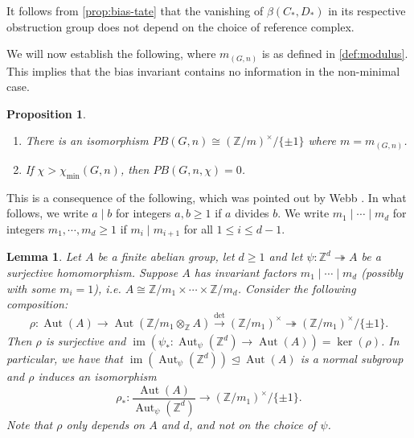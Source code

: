 \documentclass[11pt,a4paper,leqno]{amsart}
\newtheorem{proposition}[theorem]{Proposition}
\newtheorem{lemma}[theorem]{Lemma}
\theoremstyle{definition}
\theoremstyle{remark}
\newenvironment{clist}[1]
{\begin{enumerate}[\normalfont #1]}
{\end{enumerate}}
\newcommand{\Z}{\mathbb{Z}}
\DeclareMathOperator{\Aut}{Aut}
\DeclareMathOperator{\IM}{im}
\begin{document}
It follows from \cref{prop:bias-tate} that the vanishing of $\beta(C_*,D_*)$ in its respective obstruction group does not depend on the choice of reference complex.

We will now establish the following, where $m_{(G,n)}$ is as defined in \cref{def:modulus}. This implies that the bias invariant contains no information in the non-minimal case.

\begin{proposition} \label{prop:PB(Gnl)} \mbox{}
\begin{clist}{(i)}
\item There is an isomorphism $PB(G,n) \cong (\Z/m)^\times/\{\pm 1\}$ where $m =m_{(G,n)}$. 
\item If $\chi > \chi_{\min}(G,n)$, then $PB(G,n,\chi) = 0$.
\end{clist}
\end{proposition}

This is a consequence of the following, which was pointed out by Webb \cite[Corollary 3.2]{Webb:1981}.  In what follows, we write $a \mid b$ for integers $a, b \ge 1$ if $a$ divides $b$. We write $m_1 \mid \cdots \mid m_d$ for integers $m_1, \cdots, m_d \ge 1$ if $m_i \mid m_{i+1}$ for all $1 \le i \le d-1$.

\begin{lemma} \label{lemma:webb}
Let $A$ be a finite abelian group, let $d \ge 1$ and let $\psi\colon \Z^d \twoheadrightarrow A$ be a surjective homomorphism. 
Suppose $A$ has invariant factors $m_1 \mid \cdots \mid m_d$ (possibly with some $m_i=1$),  i.e. $A \cong \Z/m_1 \times \cdots \times \Z/m_d$.
Consider the following composition:
\[ \rho\colon \Aut(A) \to \Aut(\Z/m_1 \otimes_{\Z} A) \xrightarrow[]{\det} (\Z/m_1)^\times \twoheadrightarrow (\Z/m_1)^\times/\{\pm 1\}.  \]
Then $\rho$ is surjective and $\IM(\psi_*\colon \Aut_\psi(\Z^d) \to \Aut(A)) = \ker(\rho)$. In particular, we have that $\IM(\Aut_\psi(\Z^d)) \unlhd \Aut(A)$ is a normal subgroup and $\rho$ induces an isomorphism
\[ \rho_*\colon \frac{\Aut(A)}{\Aut_\psi(\Z^d)} \to (\Z/m_1)^\times/\{\pm 1\}. \] 
Note that $\rho$ only depends on $A$ and $d$, and not on the choice of $\psi$.
\end{lemma}
\end{document}
